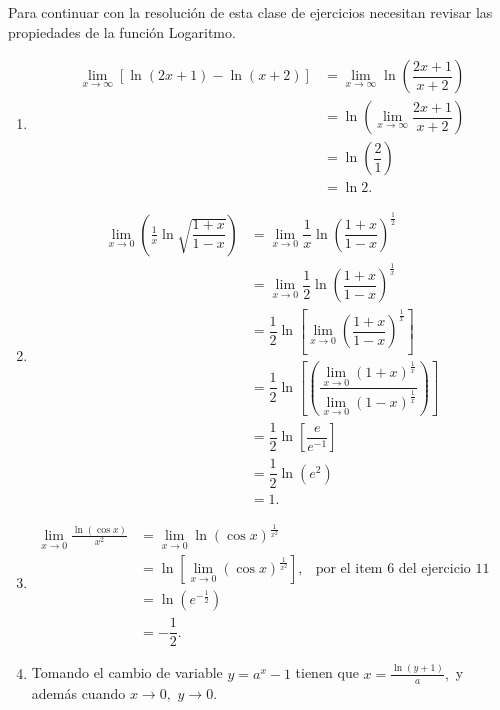 Para continuar con la resoluci\'on de esta clase de ejercicios necesitan revisar las propiedades de la funci\'on Logaritmo.\newline

\begin{example}
	\begin{enumerate}
		\item \begin{align*}
		\lim\limits_{x\to\infty}\left[\ln(2x+1)-\ln(x+2)\right]&=\lim\limits_{x\to\infty}\ln\left(\dfrac{2x+1}{x+2}\right)\\
		&=\ln\left(\lim\limits_{x\to\infty}\dfrac{2x+1}{x+2}\right)\\
		&=\ln\left(\dfrac{2}{1}\right)\\
		&=\ln 2.
		\end{align*}
		
		
		\item \begin{align*}
		\lim\limits_{x\to 0}\left(\frac{1}{x}\ln\sqrt{\dfrac{1+x}{1-x}}\right)&=\lim\limits_{x\to 0}\dfrac{1}{x}\ln\left(\dfrac{1+x}{1-x}\right)^{\frac{1}{2}}\\
		&=\lim\limits_{x\to 0}\dfrac{1}{2}\ln\left(\dfrac{1+x}{1-x}\right)^{\frac{1}{x}}\\
		&=\dfrac{1}{2}\ln\left[\lim\limits_{x\to 0}\left(\dfrac{1+x}{1-x}\right)^{\frac{1}{x}}\right]\\
		&=\dfrac{1}{2}\ln\left[\left(\dfrac{\lim\limits_{x\to 0}(1+x)^{\frac{1}{x}}}{\lim\limits_{x\to 0}(1-x)^{\frac{1}{x}}}\right)\right]\\
		&=\dfrac{1}{2}\ln\left[\dfrac{e}{e^{-1}}\right]\\
		&=\dfrac{1}{2}\ln\left(e^2\right)\\
		&=1.
		\end{align*}
		
		\item \begin{align*}
		\lim\limits_{x\to 0}\frac{\ln(\cos x)}{x^2}&=\lim\limits_{x\to 0}\ln\left(\cos x\right)^{\frac{1}{x^2}}\\
		&=\ln\left[\lim\limits_{x\to 0}(\cos x)^{\frac{1}{x^2}}\right], &\text{por el item 6 del ejercicio 11 obtenemos}\\
		&=\ln\left(e^{-\frac{1}{2}}\right)\\
		&=-\dfrac{1}{2}.
		\end{align*}
		
		\item Tomando el cambio de variable \(y=a^x-1\) tienen que \(x=\frac{\ln(y+1)}{a},\) y adem\'as cuando \(x\to 0,\) \(y\to 0.\)\newline
		

\end{enumerate}
\end{example}
